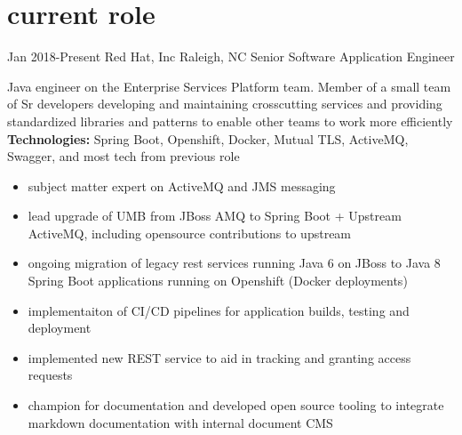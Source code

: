 
\section{current role}

\begin{entrylist}


\workentry
{Jan 2018-Present}
{Red Hat, Inc}
{Raleigh, NC}
{Senior Software Application Engineer}
{Java engineer on the Enterprise Services Platform team. Member of a small team of Sr developers developing and maintaining crosscutting services and providing standardized libraries and patterns to enable other teams to work more efficiently \\
\textbf{Technologies:} Spring Boot, Openshift, Docker, Mutual TLS, ActiveMQ, Swagger, and most tech from previous role
\begin{itemize}
\item subject matter expert on ActiveMQ and JMS messaging
\item lead upgrade of UMB from JBoss AMQ to Spring Boot + Upstream ActiveMQ, including opensource contributions to upstream
\item ongoing migration of legacy rest services running Java 6 on JBoss to Java 8 Spring Boot applications running on Openshift (Docker deployments)
\item implementaiton of CI/CD pipelines for application builds, testing and deployment
\item implemented new REST service to aid in tracking and granting access requests
\item champion for documentation and developed open source tooling to integrate markdown documentation with internal document CMS
\end{itemize}}


\end{entrylist}
